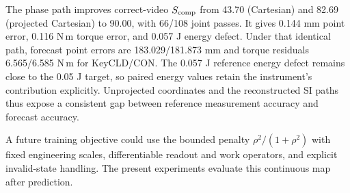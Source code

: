 The phase path improves correct-video $S_{\rm comp}$ from 43.70 (Cartesian) and 82.69 (projected Cartesian) to 90.00, with 66/108 joint passes. It gives 0.144 mm point error, 0.116 N\,m torque error, and 0.057 J energy defect. Under that identical path, forecast point errors are 183.029/181.873 mm and torque residuals 6.565/6.585 N\,m for KeyCLD/CON. The 0.057 J reference energy defect remains close to the 0.05 J target, so paired energy values retain the instrument's contribution explicitly. Unprojected coordinates and the reconstructed SI paths thus expose a consistent gap between reference measurement accuracy and forecast accuracy.

A future training objective could use the bounded penalty $\rho^2/(1+\rho^2)$ with fixed engineering scales, differentiable readout and work operators, and explicit invalid-state handling. The present experiments evaluate this continuous map after prediction.
\FloatBarrier
